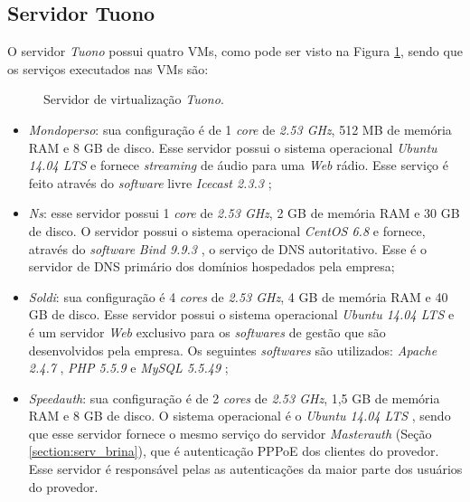 \subsection{Servidor Tuono}
\label{section:serv_tuono}

O servidor \textit{Tuono} possui quatro \ac{VM}s, como pode ser visto na Figura \ref{fig:servidor_tuono}, sendo que os serviços executados nas 
\ac{VM}s são:

\begin{figure}[h!]
 \centering
 \caption{Servidor de virtualização \textit{Tuono}.}
 \label{fig:servidor_tuono}
\end{figure}

\begin{itemize}
 \item \textit{Mondoperso}: sua configuração é de 1 \textit{core} de \textit{2.53 GHz}, 512 MB de memória \ac{RAM} e 8 GB de disco. 
 Esse servidor possui o sistema operacional \textit{Ubuntu 14.04 \ac{LTS}} \cite{ubuntu} e fornece \textit{streaming} de áudio para uma 
 \textit{Web} rádio. Esse serviço é feito através do \textit{software} livre \textit{Icecast 2.3.3} \cite{icecast};
 
 \item \textit{Ns}: esse servidor possui 1 \textit{core} de \textit{2.53 GHz}, 2 GB de memória \ac{RAM} e 30 GB de disco. O servidor possui o sistema 
 operacional \textit{CentOS 6.8} \cite{centos} e fornece, através do \textit{software} \textit{Bind 9.9.3} \cite{bind}, o serviço de \ac{DNS} 
 autoritativo. Esse é o servidor de \ac{DNS} primário dos domínios hospedados pela empresa;

 \item \textit{Soldi}: sua configuração é 4 \textit{cores} de \textit{2.53 GHz}, 4 GB de memória \ac{RAM} e 40 GB de disco. 
 Esse servidor possui o sistema operacional \textit{Ubuntu 14.04 \ac{LTS}} \cite{ubuntu} e é um servidor \textit{Web} exclusivo para os
 \textit{softwares} de gestão que são desenvolvidos pela empresa. Os seguintes \textit{softwares} são utilizados: \textit{Apache 2.4.7} 
 \cite{apache}, \textit{\ac{PHP} 5.5.9} \cite{php} e \textit{MySQL 5.5.49} \cite{mysql};

 \item \textit{Speedauth}: sua configuração é de 2 \textit{cores} de \textit{2.53 GHz}, 1,5 GB de memória \ac{RAM} e 8 GB de disco. 
 O sistema operacional é o \textit{Ubuntu 14.04 \ac{LTS}} \cite{ubuntu}, sendo que esse servidor fornece o mesmo serviço do servidor 
 \textit{Masterauth} (Seção \ref{section:serv_brina}), que é autenticação \ac{PPPoE} dos clientes do provedor. Esse servidor é responsável pelas 
 as autenticações da maior parte dos usuários do provedor.
\end{itemize}

